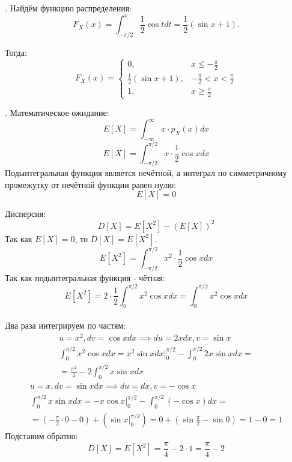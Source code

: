 \documentclass[a4paper,14pt]{extarticle}
\begin{document}
            . Найдём функцию распределения:
            \[F_X(x) = \int_{-\pi/2}^{x}\frac{1}{2}\cos t dt = \frac{1}{2} (\sin x + 1). \]
            
            Тогда: \[ \boxed{F_X (x)= \begin{cases}
                                          0, & x \leq -\frac{\pi}{2} \\
                                          \frac{1}{2} (\sin x + 1), & -\frac{\pi}{2} < x < \frac{\pi}{2} \\
                                          1, & x \geq \frac{\pi}{2}
    \end{cases}}\]
            
            . Математическое ожидание:
            \[E[X] = \int_{-\infty}^{\infty} x \cdot p_X(x) dx\]
            \[E[X] = \int_{-\pi/2}^{\pi/2} x \cdot \frac{1}{2} \cos x dx\]
            Подынтегральная функция является нечётной, а интеграл по симметричному промежутку от нечётной функции равен нулю:
            \[\boxed{E[X] = 0}\]
            
            Дисперсия:
            \[D[X] = E[X^2] - (E[X])^2\]
            Так как $E[X] = 0$, то $D[X] = E[X^2]$.
            \[E[X^2] = \int_{-\pi/2}^{\pi/2} x^2 \cdot \frac{1}{2} \cos x dx\]
            Так как подынтегральная функция - чётная: \[E[X^2] = 2 \cdot \frac{1}{2} \int_{0}^{\pi/2} x^2 \cos x dx = \int_{0}^{\pi/2} x^2 \cos x dx\]
            \\ Два раза интегрируем по частям:
            \begin{gather*}
                u = x^2, dv = \cos x dx \implies du = 2x dx, v = \sin x \\
                \int_{0}^{\pi/2} x^2 \cos x dx = x^2 \sin x dx |^{\pi/2}_{0} - \int_{0}^{\pi/2} 2x \sin x dx = \\
                = \frac{\pi^2}{4} - 2 \int_{0}^{\pi/2} x \sin x dx
            \end{gather*}
            \begin{gather*}
                u = x, dv = \sin x dx \implies du = dx, v = -\cos x \\
                \int_{0}^{\pi/2} x \sin x dx = -x \cos x |^{\pi/2}_0 - \int_{0}^{\pi/2} (-\cos x) dx = \\
                = (-\frac{\pi}{2} \cdot 0 - 0) + (\sin x |^{\pi/2}_0) = 0 + (\sin \frac{\pi}{2} - \sin 0) = 1 - 0 = 1
            \end{gather*}
            Подставим обратно:
            \[\boxed{D[X] = E[X^2] = \frac{\pi}{4} - 2 \cdot 1 = \frac{\pi}{4} - 2}\]
            
\end{document}
